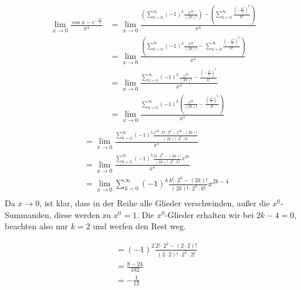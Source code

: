 \documentclass[a4paper,german,12pt,smallheadings]{scrartcl}
\begin{document}
\begin{align*}
  \lim_{x \to 0} \frac{\cos x - e^{-\frac{x^2}{2}}}{x^4} &= \lim_{x \to 0} \frac{\left(\sum_{k=0}^\infty (-1)^k \frac{x^{2k}}{(2k)!}\right) - \left(\sum_{k=0}^{\infty} \frac{\left(-\frac{x^2}{2}\right)^k}{k!} \right)}{x^4} \\
   &= \lim_{x \to 0} \frac{\left(\sum_{k=0}^\infty (-1)^k \frac{x^{2k}}{(2k)!} - \sum_{k=0}^{\infty} \frac{\left(-\frac{x^2}{2}\right)^k}{k!} \right)}{x^4} \\
   &= \lim_{x \to 0} \frac{\sum_{k=0}^\infty (-1)^k \frac{x^{2k}}{(2k)!} - \frac{\left(-\frac{x^2}{2}\right)^k}{k!} }{x^4} \\
   &= \lim_{x \to 0} \frac{\sum_{k=0}^\infty (-1)^k \left(\frac{x^{2k}}{(2k)!} - \frac{\left(\frac{x^2}{2}\right)^k}{k!}\right)}{x^4} \\
\end{align*}
\begin{align*}
   &= \lim_{x \to 0} \frac{\sum_{k=0}^\infty (-1)^k \frac{x^{2k}\cdot k! \cdot 2^k - x^{2k} \cdot (2k)!}{(2k)! \cdot 2^k \cdot k!}}{x^4} \\
   &= \lim_{x \to 0} \frac{\sum_{k=0}^\infty (-1)^k \frac{k! \cdot 2^k -  (2k)!}{(2k)! \cdot 2^k \cdot k!} x^{2k}}{x^4} \\
   &= \lim_{x \to 0} \sum_{k=0}^\infty (-1)^k \frac{k! \cdot 2^k -  (2k)!}{(2k)! \cdot 2^k \cdot k!} x^{2k-4} \\
\end{align*}
    Da $x \to 0$, ist klar, dass in der Reihe alle Glieder verschwinden, außer die
    $x^0$-Summanden, diese werden zu $x^0 = 1$. Die $x^0$-Glieder erhalten wir bei
    $2k-4 = 0$, beachten also nur $k=2$ und werfen den Rest weg.

\begin{align*}
   &= (-1)^2 \frac{2! \cdot 2^2 -  (2\cdot2)!}{(2\cdot2)! \cdot 2^2 \cdot 2!} \\
   &= \frac{8 - 24}{192} \\
   &= -\frac{1}{12}
\end{align*}
\end{document}
